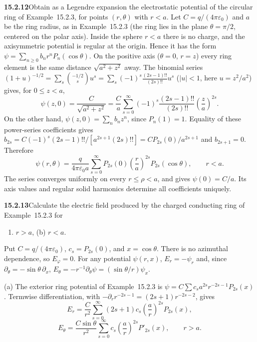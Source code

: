\par\bigskip
\noindent\textbf{15.2.12}\quad Obtain as a Legendre expansion the
electrostatic potential of the circular ring of Example~15.2.3, for
points $(r,\theta)$ with $r<a$.
\solution
Let $C=q/(4\pi\varepsilon_0)$ and $a$ be the ring radius, as in
Example~15.2.3 (the ring lies in the plane $\theta=\pi/2$, centered on
the polar axis). Inside the sphere $r<a$ there is no charge, and the
axisymmetric potential is regular at the origin. Hence it has the form
$\psi=\sum_{n\ge0}b_nr^nP_n(\cos\theta)$.
On the positive axis ($\theta=0$, $r=z$) every ring element is the same
distance $\sqrt{a^2+z^2}$ away. The binomial series
$(1+u)^{-1/2}=\sum_s\binom{-1/2}{s}u^s
=\sum_s(-1)^s\frac{(2s-1)!!}{(2s)!!}u^s$ ($|u|<1$, here $u=z^2/a^2$)
gives, for $0\le z<a$,
\[
\psi(z,0)=\frac{C}{\sqrt{a^2+z^2}}
=\frac Ca\sum_{s=0}^\infty
(-1)^s\frac{(2s-1)!!}{(2s)!!}\left(\frac za\right)^{2s}.
\]
On the other hand, $\psi(z,0)=\sum_nb_nz^n$, since $P_n(1)=1$.
Equality of these power-series coefficients gives
$b_{2s}=C(-1)^s(2s-1)!!/[a^{2s+1}(2s)!!]=CP_{2s}(0)/a^{2s+1}$ and
$b_{2s+1}=0$. Therefore
\[
\boxed{\psi(r,\theta)=\frac{q}{4\pi\varepsilon_0a}
\sum_{s=0}^\infty P_{2s}(0)\left(\frac ra\right)^{2s}
P_{2s}(\cos\theta)},\qquad r<a.
\]
The series converges uniformly on every $r\le\rho<a$, and gives
$\psi(0)=C/a$. Its axis values and regular solid harmonics determine
all coefficients uniquely.

\par\bigskip
\noindent\textbf{15.2.13}\quad Calculate the electric field produced by
the charged conducting ring of Example~15.2.3 for
\begin{enumerate}
\item[(a)] $r>a$, \quad (b) $r<a$.
\end{enumerate}
\solution
Put $C=q/(4\pi\varepsilon_0)$, $c_s=P_{2s}(0)$, and $x=\cos\theta$.
There is no azimuthal dependence, so $E_\varphi=0$.
For any potential $\psi(r,x)$,
$E_r=-\psi_r$ and, since $\partial_\theta=-\sin\theta\,\partial_x$,
$E_\theta=-r^{-1}\partial_\theta\psi=(\sin\theta/r)\psi_x$.

(a) The exterior ring potential of Example~15.2.3 is
$\psi=C\sum c_sa^{2s}r^{-2s-1}P_{2s}(x)$. Termwise differentiation,
with $-\partial_rr^{-2s-1}=(2s+1)r^{-2s-2}$, gives
\[
\boxed{E_r=\frac C{r^2}\sum_{s=0}^\infty
(2s+1)c_s\left(\frac ar\right)^{2s}P_{2s}(x)},
\]
\[
\boxed{E_\theta=\frac{C\sin\theta}{r^2}\sum_{s=0}^\infty
c_s\left(\frac ar\right)^{2s}P'_{2s}(x)},\qquad r>a.
\]

